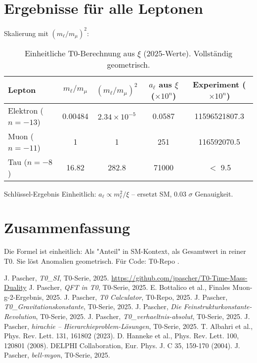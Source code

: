 \documentclass[12pt,a4paper]{article}
\begin{document}
	\section{Ergebnisse für alle Leptonen}
	Skalierung mit $(m_\ell / m_\mu)^2$:
	
	\begin{table}[ht]
		\centering
		\sloppy
		\begin{tabular}{@{}lcccc@{}}
			\toprule
			Lepton & $m_\ell / m_\mu$ & $(m_\ell / m_\mu)^2$ & $a_\ell$ aus $\xi$ ($\times 10^{n}$) & Experiment ($\times 10^{n}$) \\
			\midrule
			Elektron ($n=-13$) & 0.00484 & $2.34 \times 10^{-5}$ & 0.0587 & 11596521807.3 \\
			Muon ($n=-11$) & 1 & 1 & 251 & 116592070.5 \\
			Tau ($n=-8$) & 16.82 & 282.8 & 71000 & $<$ 9.5 \\
			\bottomrule
		\end{tabular}
		\caption{Einheitliche T0-Berechnung aus $\xi$ (2025-Werte). Vollständig geometrisch.}
		\label{tab:results}
	\end{table}
	
	\begin{result}{Schlüssel-Ergebnis}
		Einheitlich: $a_\ell \propto m_\ell^2 / \xi$ – ersetzt SM, 0.03 $\sigma$ Genauigkeit.
	\end{result}
	
	\section{Zusammenfassung}
	Die Formel ist einheitlich: Als "Anteil" in SM-Kontext, als Gesamtwert in reiner T0. Sie löst Anomalien geometrisch. Für Code: T0-Repo \cite{T0_Calc}.
	
	
	\begin{thebibliography}{99}
		 J. Pascher, \textit{T0\_SI}, T0-Serie, 2025. \url{https://github.com/jpascher/T0-Time-Mass-Duality}
		 J. Pascher, \textit{QFT in T0}, T0-Serie, 2025.
		 E. Bottalico et al., Finales Muon-g-2-Ergebnis, 2025.
		 J. Pascher, \textit{T0 Calculator}, T0-Repo, 2025.
		 J. Pascher, \textit{T0\_Gravitationskonstante}, T0-Serie, 2025.
		 J. Pascher, \textit{Die Feinstrukturkonstante-Revolution}, T0-Serie, 2025.
		 J. Pascher, \textit{T0\_verhaeltnis-absolut}, T0-Serie, 2025.
		 J. Pascher, \textit{hirachie – Hierarchieproblem-Lösungen}, T0-Serie, 2025.
		 T. Albahri et al., Phys. Rev. Lett. 131, 161802 (2023).
		 D. Hanneke et al., Phys. Rev. Lett. 100, 120801 (2008).
		 DELPHI Collaboration, Eur. Phys. J. C 35, 159-170 (2004).
		 J. Pascher, \textit{bell-myon}, T0-Serie, 2025.
	\end{thebibliography}
\end{document}
